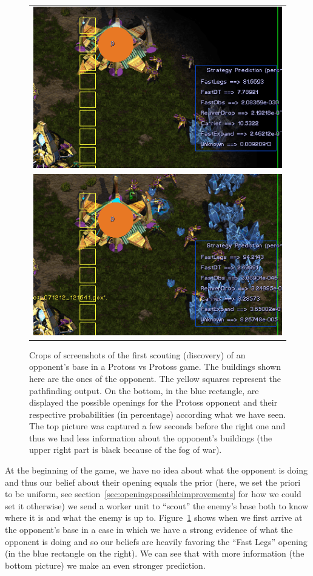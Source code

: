 \begin{figure}[h]
\begin{center}
\begin{tabular}{c}
\includegraphics[width=0.66\columnwidth]{images/botgame/scout1.png}\\
\includegraphics[width=0.66\columnwidth]{images/botgame/scout2.png}
\end{tabular}
\caption{Crops of screenshots of the first scouting (discovery) of an opponent's base in a Protoss vs Protoss game. The buildings shown here are the ones of the opponent. The yellow squares represent the pathfinding output. On the bottom, in the blue rectangle, are displayed the possible openings for the Protoss opponent and their respective probabilities (in percentage) according what we have seen. The top picture was captured a few seconds before the right one and thus we had less information about the opponent's buildings (the upper right part is black because of the fog of war).}
\label{fig:bot_scout}
\end{center}
\end{figure}

At the beginning of the game, we have no idea about what the opponent is doing and thus our belief about their opening equals the prior (here, we set the priori to be uniform, see section~\ref{sec:openingspossibleimprovements} for how we could set it otherwise) we send a worker unit to ``scout'' the enemy's base both to know where it is and what the enemy is up to. Figure~\ref{fig:bot_scout} shows when we first arrive at the opponent's base in a case in which we have a strong evidence of what the opponent is doing and so our beliefs are heavily favoring the ``Fast Legs'' opening (in the blue rectangle on the right). We can see that with more information (the bottom picture) we make an even stronger prediction.

